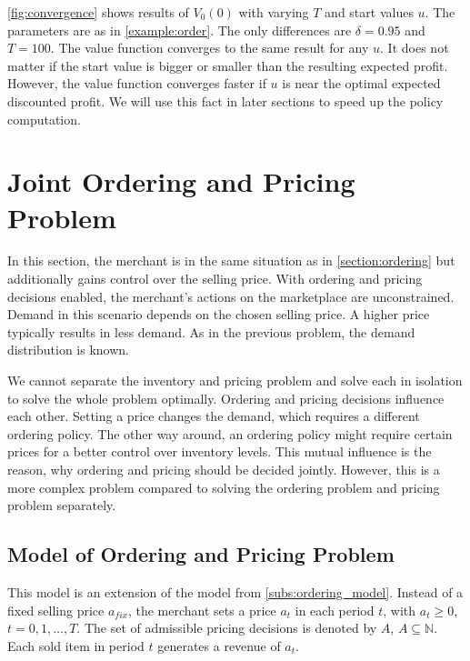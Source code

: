 \cref{fig:convergence} shows results of $V_0(0)$ with varying $T$ and start values $u$.
The parameters are as in \cref{example:order}.
The only differences are $\delta = 0.95$ and $T = 100$.
The value function converges to the same result for any $u$.
It does not matter if the start value is bigger or smaller than the resulting expected profit.
However, the value function converges faster if $u$ is near the optimal expected discounted profit.
We will use this fact in later sections to speed up the policy computation.


\section{Joint Ordering and Pricing Problem}
\label{section:joint_ordering_pricing}
In this section, the merchant is in the same situation as in \cref{section:ordering} but additionally gains control over the selling price.
With ordering and pricing decisions enabled, the merchant's actions on the marketplace are unconstrained.
Demand in this scenario depends on the chosen selling price.
A higher price typically results in less demand.
As in the previous problem, the demand distribution is known.

We cannot separate the inventory and pricing problem and solve each in isolation to solve the whole problem optimally.
Ordering and pricing decisions influence each other.
Setting a price changes the demand, which requires a different ordering policy.
The other way around, an ordering policy might require certain prices for a better control over inventory levels.
This mutual influence is the reason, why ordering and pricing should be decided jointly.
However, this is a more complex problem compared to solving the ordering problem and pricing problem separately.

\subsection{Model of Ordering and Pricing Problem}
\label{subs:joint_model}
This model is an extension of the model from \cref{subs:ordering_model}.
Instead of a fixed selling price $a_{fix}$, the merchant sets a price $a_t$ in each period $t$, with $a_t \geq 0$, $t=0,1,\ldots,T$.
The set of admissible pricing decisions is denoted by $A$, $A \subseteq  \mathbb{N}$.
Each sold item in period $t$ generates a revenue of $a_t$.


